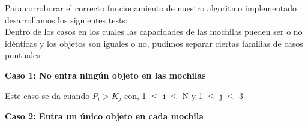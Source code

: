 \indent Para corroborar el correcto funcionamiento de nuestro algoritmo implementado desarrollamos los siguientes tests:\\

Dentro de los casos en los cuales las capacidades de las mochilas pueden ser o no id\'enticas y los objetos son iguales o no, pudimos separar ciertas familias de casos puntuales:\\










\begin{center}
\textbf{Caso 1: No entra ning\'un objeto en las mochilas}
\end{center}

Este caso se da cuando $P_{i} > K_{j}$ con, 1 $\leq$ i $\leq$ N y 1 $\leq$ j $\leq$ 3\\

\begin{center}
\textbf{Caso 2: Entra un \'unico objeto en cada mochila}

\end{center}

